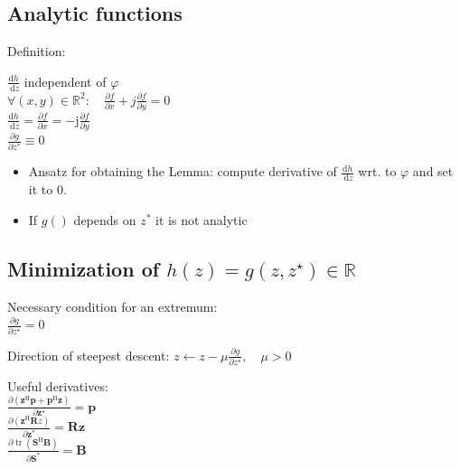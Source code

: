 \documentclass[english]{latex4ei/latex4ei_sheet}
\begin{document}
\begin{sectionbox}
\subsection{Analytic functions}
Definition:
\begin{emphbox}
  $\frac{\mathrm{d} h}{\mathrm{~d} z}$ independent of $\varphi$\\
  $\forall(x, y) \in \mathbb{R}^{2}: \quad \frac{\partial f}{\partial x}+j \frac{\partial f}{\partial y}=0$\\
  $\frac{\mathrm{d} h}{\mathrm{~d} z}=\frac{\partial f}{\partial x}=-\mathrm{j} \frac{\partial f}{\partial y}$\\
  $\frac{\partial g}{\partial z^{*}} \equiv 0$
\end{emphbox}
\begin{itemize}
  \item Ansatz for obtaining the Lemma: compute derivative of $\frac{\mathrm{d} h}{\mathrm{~d} z}$ wrt. to $\varphi$ and set it to 0.
  \item If $g()$ depends on $z^*$ it is not analytic
\end{itemize}
\end{sectionbox}

\begin{sectionbox}
  \subsection{Minimization of $h(z)=g\left(z, z^{\star}\right) \in \mathbb{R}$}
  \begin{emphbox}
    Necessary condition for an extremum:\\
    $\frac{\partial g}{\partial z^{\star}}=0$
  \end{emphbox}
  Direction of steepest descent: $z \leftarrow z-\mu \frac{\partial g}{\partial z^{\star}}, \quad \mu>0$\\
  \begin{emphbox}
    Useful derivatives:\\
    $\frac{\partial\left(\boldsymbol{z}^{\mathrm{H}} \boldsymbol{p}+\boldsymbol{p}^{\mathrm{H}} \boldsymbol{z}\right)}{\partial \boldsymbol{z}^{\star}} = \boldsymbol{p}$\\
    $\frac{\partial\left(\boldsymbol{z}^{\mathrm{H}} \boldsymbol{R} z\right)}{\partial \boldsymbol{z}^{*}}=\boldsymbol{R}\boldsymbol{z}$\\
    $\frac{\partial \operatorname{tr}\left(\boldsymbol{S}^{\mathrm{H}} \boldsymbol{B}\right)}{\partial \boldsymbol{S}^{*}} = \boldsymbol{B}$
  \end{emphbox}
\end{sectionbox}
\end{document}
